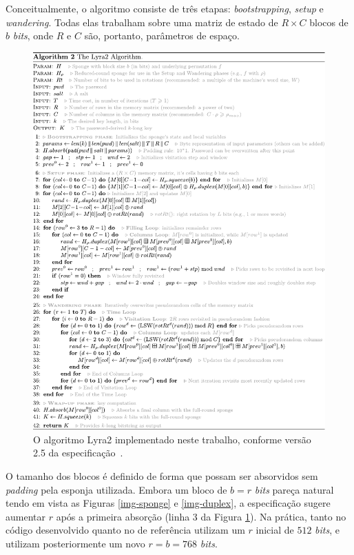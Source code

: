 \documentclass{article}
\begin{document}
Conceitualmente, o algoritmo consiste de três etapas: \emph{bootstrapping},
\emph{setup} e \emph{wandering}. Todas elas trabalham sobre uma matriz
de estado de $R \times C$ blocos de $b$ \emph{bits}, onde $R$ e $C$
são, portanto, parâmetros de espaço.

\begin{figure}[htbp]
\centering
\includegraphics[width=\linewidth]{./img/spec.pdf}
\caption{O algoritmo Lyra2 implementado neste trabalho\label{lyra2-alg}, conforme versão 2.5 da especificação~\cite{lyra2-spec}.}
\end{figure}

O tamanho dos blocos é definido de forma que possam ser absorvidos sem
\emph{padding} pela esponja utilizada. Embora um bloco de $b = r$ \emph{bits}
pareça natural tendo em vista as Figuras \ref{img-sponge} e
\ref{img-duplex}, a especificação sugere aumentar $r$ após a primeira
absorção (linha 3 da Figura \ref{lyra2-alg}). Na prática, tanto no
código desenvolvido quanto no de referência utilizam um $r$ inicial de $512$ \emph{bits},
e utilizam posteriormente um novo $r = b = 768$ \emph{bits}.
\end{document}
